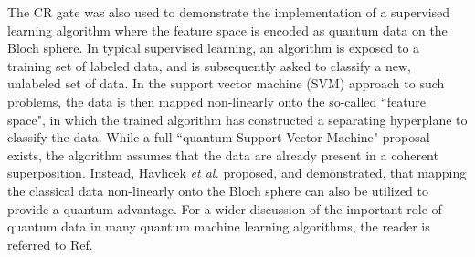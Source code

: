 \documentclass[aip,apr,twocolumn,showpacs,superscriptaddress,groupedaddress,nofootinbib,reprint]{revtex4-1}  %
\newcommand{\CR}{\textsf{CR}}
\newcommand{\etal}{\emph{et al.}}
\begin{document}
The \CR{} gate was also used to demonstrate the implementation of a supervised learning algorithm where the feature space is encoded as quantum data on the Bloch sphere\cite{Havlicek2018}. In typical supervised learning, an algorithm is exposed to a training set of labeled data, and is subsequently asked to classify a new, unlabeled set of data\cite{MacKay2003}. In the support vector machine (SVM) approach to such problems, the data is then mapped non-linearly onto the so-called ``feature space", in which the trained algorithm has constructed a separating hyperplane to classify the data. While a full ``quantum Support Vector Machine" proposal exists, the algorithm assumes that the data are already present in a coherent superposition\cite{Rebentrost2014}. Instead, Havlicek \etal{}\cite{Havlicek2018} proposed, and demonstrated, that mapping the classical data non-linearly onto the Bloch sphere can also be utilized to provide a quantum advantage. For a wider discussion of the important role of quantum data in many quantum machine learning algorithms, the reader is referred to Ref.

\end{document}
